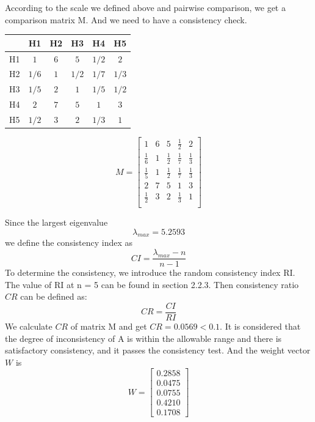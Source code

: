 \documentclass{mcmthesis}
\begin{document}
    According to the scale we defined above and pairwise comparison, we get a  comparison matrix M. And we need to have a consistency check. 
    
    \begin{center}
    \begin{tabular}{|c|c|c|c|c|c|}
        \hline
          & H1 & H2 & H3 & H4 & H5  \\
        \hline
         H1 & $1$ & $6$ & $5$ & $1/2$ & $2$ \\
         \hline
         H2 & $1/6$ & $1$ & $1/2$ & $1/7$ & $1/3$  \\
         \hline
         H3 & $1/5$ & $2$ & $1$ & $1/5$ & $1/2$  \\
         \hline
         H4 & $2$ & $7$ & $5$ & $1$ & $3$  \\
         \hline
         H5 & $1/2$ & $3$ & $2$ & $1/3$ & $1$  \\
        \hline
    \end{tabular}
\end{center}

$$
    M = 
    \begin{bmatrix}
        1 & 6& 5 & \frac{1}{2} & 2 \\
       \frac{1}{6}  & 1 & \frac{1}{2}  & \frac{1}{7}  & \frac{1}{3}   \\
        \frac{1}{5}  & 1 & \frac{1}{2}  & \frac{1}{7}  & \frac{1}{3}  \\
        2 & 7 & 5 & 1 & 3 \\
       \frac{1}{2}  & 3 & 2 & \frac{1}{3}  & 1\\ 
    \end{bmatrix}
$$

    Since the largest eigenvalue $$\lambda_{max} = 5.2593$$ we define the consistency index as$$CI = \frac{\lambda_{max}-n}{n-1}$$ To determine the consistency, we introduce the random consistency index RI. The value of RI at n = 5 can be found in section 2.2.3. Then consistency ratio $CR$ can be defined as:$$CR = \frac{CI}{RI}$$
    We calculate $CR$ of matrix M and get $CR = 0.0569 < 0.1$. It is considered that the degree of inconsistency of A is within the allowable range and there is satisfactory consistency, and it passes the consistency test. And the weight vector $W$ is
$$
W = 
\begin{bmatrix}
0.2858 \\ 0.0475 \\ 0.0755 \\ 0.4210 \\ 0.1708
\end{bmatrix}
$$
\end{document}
